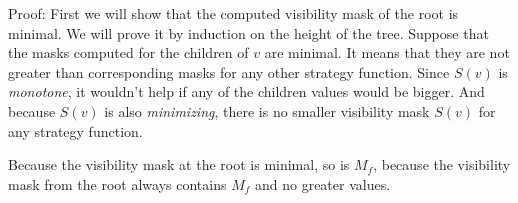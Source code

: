 Proof: First we will show that the computed visibility mask of the root is minimal. We will
prove it by induction on the height of the tree. Suppose that the masks computed for the
children of $v$ are minimal. It means that they are not greater than corresponding masks for
any other strategy function. Since $S(v)$ is \emph{monotone}, it wouldn't help if
any of the children values would be bigger. And because $S(v)$ is also \emph{minimizing},
there is no smaller visibility mask $S(v)$ for any strategy function.

Because the visibility mask at the root is minimal, so is $M_f$, because the visibility mask
from the root always contains $M_f$ and no greater values.
